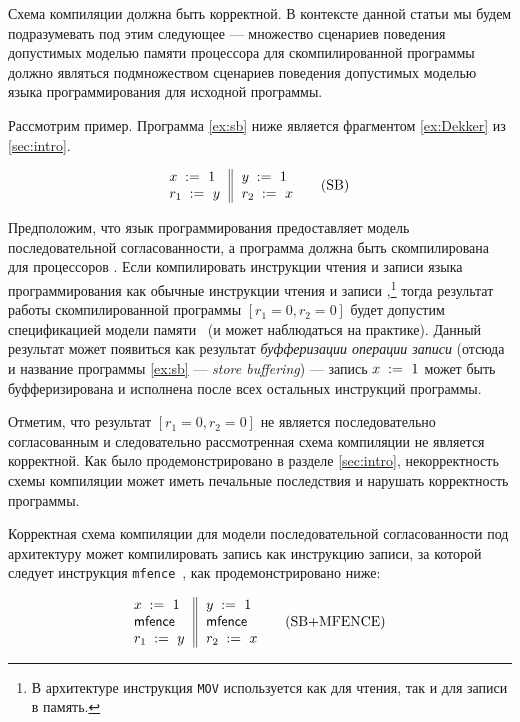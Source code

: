 Схема компиляции должна быть корректной. 
В контексте данной статьи мы будем подразумевать под 
этим следующее --- множество сценариев поведения допустимых
моделью памяти процессора для скомпилированной программы 
должно являться подмножеством сценариев поведения допустимых 
моделью языка программирования для исходной программы. 

Рассмотрим пример. 
Программа \ref{ex:sb} ниже является 
фрагментом \ref{ex:Dekker} из \cref{sec:intro}.

\begin{equation*}
\inarrII{
   \writeInst{}{x}{1}   \\
   \readInst{}{r_1}{y}  \\
}{
  \writeInst{}{y}{1}   \\
  \readInst{}{r_2}{x}  \\
}
\tag{SB}\label{ex:sb}
\end{equation*}

Предположим, что язык программирования предоставляет 
модель последовательной согласованности, а программа
должна быть скомпилирована для процессоров \Intel. 
Если компилировать инструкции чтения и записи языка программирования 
как обычные инструкции чтения и записи \Intel,\footnote{
В архитектуре \Intel инструкция \texttt{MOV} 
используется как для чтения, так и для записи в память.}
тогда результат работы скомпилированной программы
${[r_1=0, r_2=0]}$ будет допустим спецификацией модели памяти~\Intel
(и может наблюдаться на практике). 
Данный результат может появиться как результат 
\emph{буфферизации операции записи}
(отсюда и название программы \ref{ex:sb} --- \emph{store buffering}) ---  
запись ${x\;:=_{}\;1}$ может быть буфферизирована 
и исполнена после всех остальных инструкций программы. 

Отметим, что результат ${[r_1=0, r_2=0]}$ не является последовательно согласованным
и следовательно рассмотренная схема компиляции не является корректной. 
Как было продемонстрировано в разделе \cref{sec:intro}, 
некорректность схемы компиляции может иметь 
печальные последствия и нарушать корректность программы. 

Корректная схема компиляции для модели последовательной согласованности 
под архитектуру \Intel может компилировать 
запись как инструкцию записи, за которой следует 
инструкция \texttt{mfence}~\cite{Sewell-al:CACM10, Batty-al:POPL11}, 
как продемонстрировано ниже:

\begin{equation*}
\inarrII{
   \writeInst{}{x}{1}   \\
   \mfenceInst          \\
   \readInst{}{r_1}{y}  \\
}{
  \writeInst{}{y}{1}   \\
  \mfenceInst          \\
  \readInst{}{r_2}{x}  \\
}
\tag{SB+MFENCE}\label{ex:sb-mfence}
\end{equation*}

